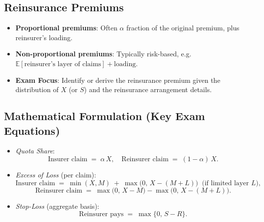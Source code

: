 \documentclass[13pt,a4paper]{article}
\begin{document}
\subsection{Reinsurance Premiums}
\begin{itemize}
  \item \textbf{Proportional premiums}: Often \(\alpha\) fraction of the original premium, plus reinsurer’s loading.
  \item \textbf{Non-proportional premiums}: Typically risk-based, e.g.\ \(\mathbb{E}[\text{reinsurer’s layer of claims}] + \text{loading}\). 
  \item \textbf{Exam Focus}: Identify or derive the reinsurance premium given the distribution of \(X\) (or \(S\)) and the reinsurance arrangement details. 
\end{itemize}

\subsection{Mathematical Formulation (Key Exam Equations)}
\begin{itemize}
  \item \emph{Quota Share}: 
    \[
      \text{Insurer claim} \;=\; \alpha\,X, 
      \quad \text{Reinsurer claim} \;=\;(1-\alpha)\,X.
    \]
  \item \emph{Excess of Loss} (per claim):
    \[
      \text{Insurer claim} \;=\; \min(X, M) \;+\; \max\bigl(0,\,X - (M+L)\bigr) \;\; \text{(if limited layer }L\text{)},
    \]
    \[
      \text{Reinsurer claim} \;=\; \max\bigl(0,\,X - M\bigr) - \max\bigl(0,\,X - (M+L)\bigr).
    \]
  \item \emph{Stop-Loss} (aggregate basis):
    \[
      \text{Reinsurer pays} \;=\;\max\{0,\, S - R\}.
    \]
\end{itemize}
\end{document}
